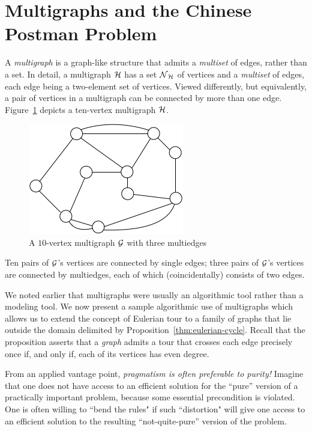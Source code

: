 \section{Multigraphs and the Chinese Postman Problem}
\label{sec:multigraphs}
  

A {\it multigraph} is a graph-like structure that admits a {\em multiset} of edges, rather than a set.  In detail, a multigraph $\mbox{$\cal H$}$ has a set $\mbox{$\cal N$}_{\mbox{{\scriptsize $\cal H$}}}$ of vertices and a {\em multiset} of edges, each edge being a two-element set of vertices.  Viewed differently, but equivalently, a pair of vertices in a multigraph can be connected by more than one edge.  Figure~\ref{fig:EulerianFinal} depicts a ten-vertex multigraph $\mbox{$\cal H$}$.
\begin{figure}[hbt]
\begin{center}
       \includegraphics[scale=0.4]{FiguresGraph/EulerienFinal}
       \caption{A $10$-vertex multigraph $\mbox{$\cal G$}$ with three multiedges}
              \label{fig:EulerianFinal}
\end{center}
\end{figure}
Ten pairs of $\mbox{$\cal G$}$'s vertices are connected by single edges; three pairs of $\mbox{$\cal G$}$'s vertices are connected by multiedges, each of which (coincidentally) consists of two edges.

\smallskip

We noted earlier that multigraphs were usually an algorithmic tool rather than a modeling tool.  We now present a sample algorithmic use of multigraphs which allows us to extend the concept of Eulerian tour to a family of graphs that lie outside the domain delimited by Proposition~\ref{thm:eulerian-cycle}.  Recall that the proposition asserts that a {\em graph} admits a tour that crosses each edge precisely once if, and only if, each of its vertices has even degree.

\bigskip

From an applied vantage point, {\em pragmatism is often preferable to purity!}  Imagine that one does not have access to an efficient solution for the ``pure'' version of a practically important problem, because some essential precondition is violated.  One is often willing to ``bend the rules" if such ``distortion" will give one access to an efficient solution to the resulting ``not-quite-pure'' version of the problem. 


